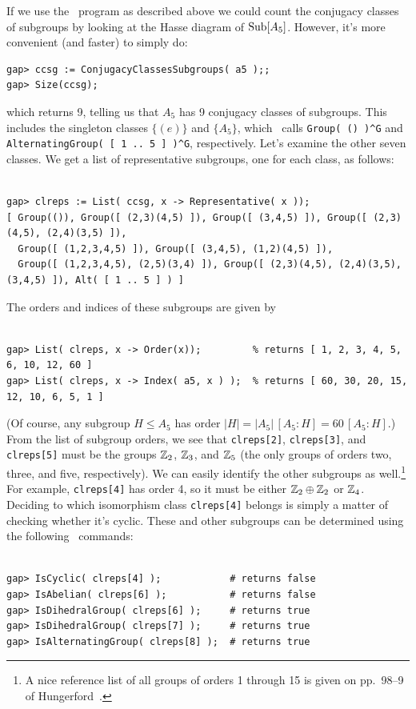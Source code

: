 If we use the \xgap\ program as described above we could count the conjugacy classes of subgroups by
looking at the Hasse diagram of $\mathrm{Sub}[A_5]$.  However, it's more convenient (and
faster) to simply do: 
{\codesize 
\begin{verbatim}
gap> ccsg := ConjugacyClassesSubgroups( a5 );;
gap> Size(ccsg);
\end{verbatim}}
\noindent which returns 9, telling us that $A_5$ has 9 conjugacy classes of subgroups.  
This includes the singleton classes $\{(e)\}$ and $\{A_5\}$,
which \gap\ calls \verb!Group( () )^G! and \verb!AlternatingGroup( [ 1 .. 5 ] )^G!,
respectively. 
Let's examine the other seven classes.  We get a list of representative subgroups, one for
each class, as follows:
{\codesize 
\begin{verbatim}

gap> clreps := List( ccsg, x -> Representative( x ));
[ Group(()), Group([ (2,3)(4,5) ]), Group([ (3,4,5) ]), Group([ (2,3)(4,5), (2,4)(3,5) ]),
  Group([ (1,2,3,4,5) ]), Group([ (3,4,5), (1,2)(4,5) ]), 
  Group([ (1,2,3,4,5), (2,5)(3,4) ]), Group([ (2,3)(4,5), (2,4)(3,5), (3,4,5) ]), Alt( [ 1 .. 5 ] ) ]

\end{verbatim}}
\noindent The orders and indices of these subgroups are given by
{\codesize 
\begin{verbatim}

gap> List( clreps, x -> Order(x));         % returns [ 1, 2, 3, 4, 5, 6, 10, 12, 60 ]
gap> List( clreps, x -> Index( a5, x ) );  % returns [ 60, 30, 20, 15, 12, 10, 6, 5, 1 ]

\end{verbatim}}
\noindent (Of course, any subgroup $H\leq A_5$ has order $|H| = |A_5|\,[A_5:H] = 60 \,[A_5:H]$.)  
From the list of subgroup orders, we see that {\tt clreps[2]}, {\tt clreps[3]},
and {\tt clreps[5]} must be the groups $\mathbb{Z}_2$, $\mathbb{Z}_3$, and $\mathbb{Z}_5$ (the only groups of 
orders two, three, and five, respectively).  
We can easily identify the other subgroups as well.\footnote{A
  nice reference list of all groups of orders 1 through 15 is given on pp.~98--9 of
  Hungerford~\cite{Hungerford:1974}.} 
For example, {\tt clreps[4]} has order 4, so it must be either 
$\mathbb{Z}_2 \oplus \mathbb{Z}_2$ or $\mathbb{Z}_4$.  Deciding to which isomorphism class {\tt clreps[4]}
belongs is simply a matter of checking whether it's cyclic.  These and other
subgroups can be determined using the following \gap\ commands:
{\codesize 
\begin{verbatim}

gap> IsCyclic( clreps[4] );            # returns false
gap> IsAbelian( clreps[6] );           # returns false
gap> IsDihedralGroup( clreps[6] );     # returns true
gap> IsDihedralGroup( clreps[7] );     # returns true
gap> IsAlternatingGroup( clreps[8] );  # returns true

\end{verbatim}}
